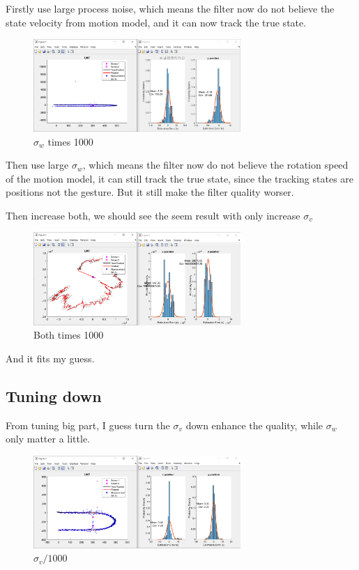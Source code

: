 Firstly use large process noise, which means the filter now do not believe the state velocity from motion model, and it can now track the true state.

\begin{figure}[H]
 \centering
 \includegraphics[width=0.7\textwidth]{images/sigmaw1000.png}
 \caption{$\sigma_w$ times 1000}
 \label{w1000}
\end{figure}

Then use large $\sigma_w$, which means the filter now do not believe the rotation speed of the motion model, it can still track the true state, since the tracking states are positions not the gesture. But it still make the filter quality worser.

Then increase both, we should see the seem result with only increase $\sigma_v$

\begin{figure}[H]
 \centering
 \includegraphics[width=0.7\textwidth]{images/both.png}
 \caption{Both times 1000}
 \label{both1000}
\end{figure}

And it fits my guess.

\subsection{Tuning down}

From tuning big part, I guess turn the $\sigma_v$ down enhance the quality, while $ \sigma_w $  only matter a little.

\begin{figure}[H]
 \centering
 \includegraphics[width=0.7\textwidth]{images/1e3sigmav.png}
 \caption{$\sigma_v/1000$}
 \label{1e-3sigmav}
\end{figure}


